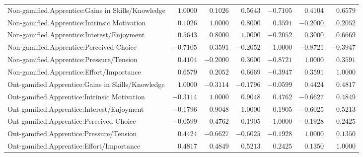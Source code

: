 \begin{landscape}
{\begin{longtable}{lrrrrrr}


Non-gamified.Apprentice:Gains in Skills/Knowledge&$ 1.0000$&$ 0.1026$&$ 0.5643$&$-0.7105$&$ 0.4104$&$ 0.6579$\tabularnewline
Non-gamified.Apprentice:Intrinsic Motivation&$ 0.1026$&$ 1.0000$&$ 0.8000$&$ 0.3591$&$-0.2000$&$ 0.2052$\tabularnewline
Non-gamified.Apprentice:Interest/Enjoyment&$ 0.5643$&$ 0.8000$&$ 1.0000$&$-0.2052$&$ 0.3000$&$ 0.6669$\tabularnewline
Non-gamified.Apprentice:Perceived Choice&$-0.7105$&$ 0.3591$&$-0.2052$&$ 1.0000$&$-0.8721$&$-0.3947$\tabularnewline
Non-gamified.Apprentice:Pressure/Tension&$ 0.4104$&$-0.2000$&$ 0.3000$&$-0.8721$&$ 1.0000$&$ 0.3591$\tabularnewline
Non-gamified.Apprentice:Effort/Importance&$ 0.6579$&$ 0.2052$&$ 0.6669$&$-0.3947$&$ 0.3591$&$ 1.0000$\tabularnewline
\hline

Ont-gamified.Apprentice:Gains in Skills/Knowledge&$ 1.0000$&$-0.3114$&$-0.1796$&$-0.0599$&$ 0.4424$&$0.4817$\tabularnewline
Ont-gamified.Apprentice:Intrinsic Motivation&$-0.3114$&$ 1.0000$&$ 0.9048$&$ 0.4762$&$-0.6627$&$0.4849$\tabularnewline
Ont-gamified.Apprentice:Interest/Enjoyment&$-0.1796$&$ 0.9048$&$ 1.0000$&$ 0.1905$&$-0.6025$&$0.5213$\tabularnewline
Ont-gamified.Apprentice:Perceived Choice&$-0.0599$&$ 0.4762$&$ 0.1905$&$ 1.0000$&$-0.1928$&$0.2425$\tabularnewline
Ont-gamified.Apprentice:Pressure/Tension&$ 0.4424$&$-0.6627$&$-0.6025$&$-0.1928$&$ 1.0000$&$0.1350$\tabularnewline
Ont-gamified.Apprentice:Effort/Importance&$ 0.4817$&$ 0.4849$&$ 0.5213$&$ 0.2425$&$ 0.1350$&$1.0000$\tabularnewline
\hline

\end{longtable}}\end{landscape}




